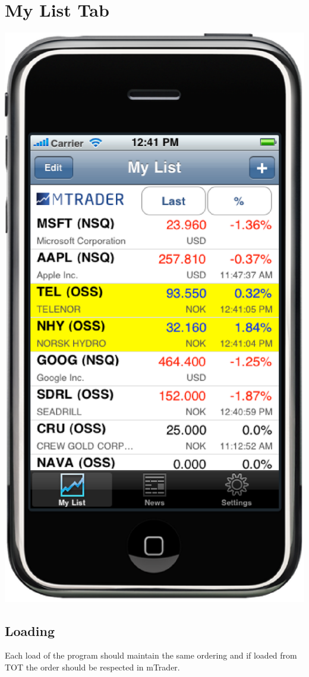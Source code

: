\documentclass[12pt,twoside,letterpaper]{report}
\begin{document}
\section*{My List Tab}
\includegraphics[scale=0.5]{myList}

\subsection*{Loading}
Each load of the program should maintain the same ordering and if loaded from TOT the order should be respected in mTrader.
\end{document}
